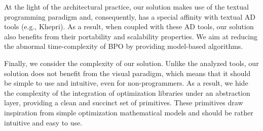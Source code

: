 At the light of the architectural practice, our solution makes use of the textual programming paradigm and, consequently, has a special affinity with textual \ac{AD} tools (e.g., Khepri). As a result, when coupled with these \ac{AD} tools, our solution also benefits from their portability and scalability properties. We aim at reducing the abnormal time-complexity of \ac{BPO} by providing model-based algorithms. 

Finally, we consider the complexity of our solution. Unlike the analyzed tools, our solution does not benefit from the visual paradigm, which means that it should be simple to use and intuitive, even for non-programmers. As a result, we hide the complexity of the integration of optimization libraries under an abstraction layer, providing a clean and succinct set of primitives. These primitives draw inspiration from simple optimization mathematical models and should be rather intuitive and easy to use. 

